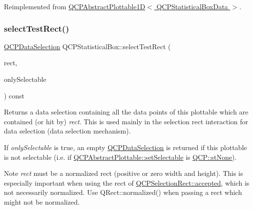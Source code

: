 Reimplemented from \hyperlink{class_q_c_p_abstract_plottable1_d_a071e2df66ba1746067dfcb5e27947b43}{Q\+C\+P\+Abstract\+Plottable1\+D$<$ Q\+C\+P\+Statistical\+Box\+Data $>$}.

\mbox{\label{class_q_c_p_statistical_box_a42febad6ad5e924a151434cc434b4ffc}} 
\subsubsection{\texorpdfstring{select\+Test\+Rect()}{selectTestRect()}}
{\footnotesize\ttfamily \hyperlink{class_q_c_p_data_selection}{Q\+C\+P\+Data\+Selection} Q\+C\+P\+Statistical\+Box\+::select\+Test\+Rect (\begin{DoxyParamCaption}\item[{const Q\+RectF \&}]{rect,  }\item[{bool}]{only\+Selectable }\end{DoxyParamCaption}) const\hspace{0.3cm}{\ttfamily [virtual]}}





Returns a data selection containing all the data points of this plottable which are contained (or hit by) {\itshape rect}. This is used mainly in the selection rect interaction for data selection (data selection mechanism).

If {\itshape only\+Selectable} is true, an empty \hyperlink{class_q_c_p_data_selection}{Q\+C\+P\+Data\+Selection} is returned if this plottable is not selectable (i.\+e. if \hyperlink{class_q_c_p_abstract_plottable_ac238d6e910f976f1f30d41c2bca44ac3}{Q\+C\+P\+Abstract\+Plottable\+::set\+Selectable} is \hyperlink{namespace_q_c_p_ac6cb9db26a564b27feda362a438db038aa64628e338a2dd1e6f0dc84dec0b63fe}{Q\+C\+P\+::st\+None}).

\begin{DoxyNote}{Note}
{\itshape rect} must be a normalized rect (positive or zero width and height). This is especially important when using the rect of \hyperlink{class_q_c_p_selection_rect_a15a43542e1f7b953a44c260b419e6d2c}{Q\+C\+P\+Selection\+Rect\+::accepted}, which is not necessarily normalized. Use {\ttfamily Q\+Rect\+::normalized()} when passing a rect which might not be normalized. 
\end{DoxyNote}


